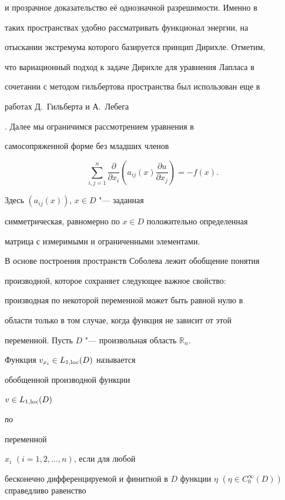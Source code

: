 и прозрачное доказательство её однозначной разрешимости. Именно в

таких пространствах удобно рассматривать функционал энергии, на

отыскании экстремума которого базируется принцип Дирихле. Отметим,

что вариационный подход к задаче Дирихле для уравнения Лапласа в

сочетании с методом гильбертова пространства был использован еще в

работах Д.~Гильберта \cite{gushin:Hilb} и А.~Лебега

\cite{gushin:Leb}. Далее мы ограничимся рассмотрением уравнения в

самосопряженной форме без младших членов

\begin{equation}

\label{gushin:eq2.1} \sum_{i,j=1}^n \frac{\partial}{\partial

x_i}\left(a_{ij}(x)\frac{\partial u}{\partial x_j}\right) = -

f(x).

\end{equation}

Здесь  $\left( a_{ij}(x)\right)$, $x \in D$ "--- заданная

симметрическая, равномерно по $x \in D$ положительно определенная

матрица с измеримыми и ограниченными элементами.





В основе построения пространств Соболева лежит обобщение понятия

производной, которое сохраняет следующее важное свойство:

производная по некоторой переменной может быть равной нулю в

области только в том случае, когда функция не зависит от этой

переменной. Пусть $D$ "--- произвольная область ${\mathbb{R}}_n$.

Функция $v_{x_i} \in L_{1,{\rm loc}}(D)$ называется {\it

обобщенной производной функции} $v \in L_{1,{\rm loc}}(D)$ {\it по

переменной} $x_i$ $(i = 1, 2, \ldots, n)$, если для любой

бесконечно дифференцируемой и финитной в $D$ функции $\eta$ $(\eta

\in C_0^{\infty}(D))$ справедливо равенство

